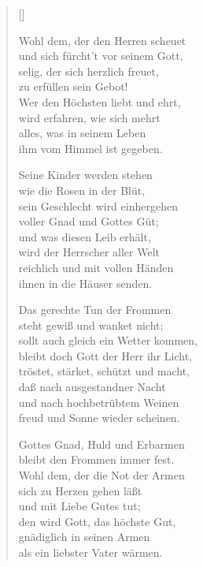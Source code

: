 \begin{multicols}{2}
\settowidth{\versewidth}{Wohl dem, der den Herren scheuet}
\begin{verse}[\versewidth]

 Wohl dem, der den Herren scheuet\\
und sich fürcht't vor seinem Gott,\\
selig, der sich herzlich freuet,\\
zu erfüllen sein Gebot!\\
Wer den Höchsten liebt und ehrt,\\
wird erfahren, wie sich mehrt\\
alles, was in seinem Leben\\
ihm vom Himmel ist gegeben.

 Seine Kinder werden stehen\\
wie die Rosen in der Blüt,\\
sein Geschlecht wird einhergehen\\
voller Gnad und Gottes Güt;\\
und was diesen Leib erhält,\\
wird der Herrscher aller Welt\\
reichlich und mit vollen Händen\\
ihnen in die Häuser senden.

 Das gerechte Tun der Frommen\\
steht gewiß und wanket nicht;\\
sollt auch gleich ein Wetter kommen,\\
bleibt doch Gott der Herr ihr Licht,\\
tröstet, stärket, schützt und macht,\\
daß nach ausgestandner Nacht\\
und nach hochbetrübtem Weinen\\
freud und Sonne wieder scheinen.

 Gottes Gnad, Huld und Erbarmen\\
bleibt den Frommen immer fest.\\
Wohl dem, der die Not der Armen\\
sich zu Herzen gehen läßt\\
und mit Liebe Gutes tut;\\
den wird Gott, das höchste Gut,\\
gnädiglich in seinen Armen\\
als ein liebster Vater wärmen.


\end{verse}
\end{multicols}
